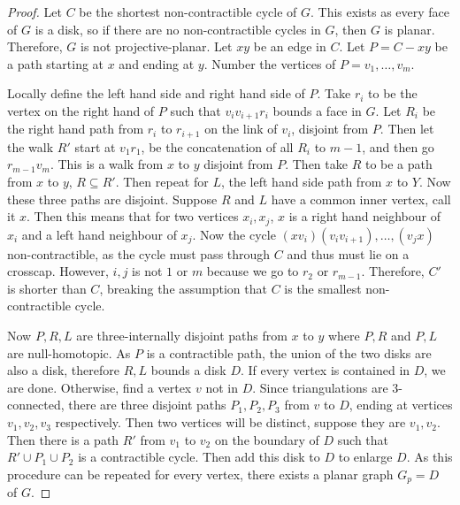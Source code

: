 \begin{proof}
    Let $C$ be the shortest non-contractible cycle of $G$. This exists as every face of $G$ is a disk, so if there are no non-contractible cycles in $G$, then $G$ is planar. Therefore, $G$ is not projective-planar. Let $xy$ be an edge in $C$. Let $P = C - xy$ be a path starting at $x$ and ending at $y$. 
    Number the vertices of $P = v_1, \ldots, v_m$. 

    Locally define the left hand side and right hand side of $P$. Take $r_i$ to be the vertex on the right hand of $P$ such that $v_i v_{i + 1} r_i$ bounds a face in $G$. Let $R_i$ be the right hand path from $r_i$ to $r_{i + 1}$ on the link of $v_i$, disjoint from $P$. Then let the walk $R'$ start at $v_1 r_1$, be the concatenation of all $R_i$ to $m-1$, and then go $r_{m-1} v_m$. This is a walk from $x$ to $y$ disjoint from $P$. Then take $R$ to be a path from $x$ to $y$, $R \subseteq R'$. Then repeat for $L$, the left hand side path from $x$ to $Y$. Now these three paths are disjoint. Suppose $R$ and $L$ have a common inner vertex, call it $x$. Then this means that for two vertices $x_i, x_j$, $x$ is a right hand neighbour of $x_i$ and a left hand neighbour of $x_j$. Now the cycle $(x v_i) (v_i v_{i + 1}), \ldots , (v_j x)$ non-contractible, as the cycle must pass through $C$ and thus must lie on a crosscap. However, $i, j$ is not $1$ or $m$ because we go to $r_2$ or $r_{m-1}$. Therefore, $C'$ is shorter than $C$, breaking the assumption that $C$ is the smallest non-contractible cycle.

    Now $P, R, L$ are three-internally disjoint paths from $x$ to $y$ where $P, R$ and $P, L$ are null-homotopic. As $P$ is a contractible path, the union of the two disks are also a disk, therefore $R, L$ bounds a disk $D$. If every vertex is contained in $D$, we are done. Otherwise, find a vertex $v$ not in $D$. Since triangulations are 3-connected, there are three disjoint paths $P_1, P_2, P_3$ from $v$ to $D$, ending at vertices $v_1, v_2, v_3$ respectively. Then two vertices will be distinct, suppose they are $v_1, v_2$. Then there is a path $R'$ from $v_1$ to $v_2$ on the boundary of $D$ such that $R' \cup P_1 \cup P_2$ is a contractible cycle. Then add this disk to $D$ to enlarge $D$. As this procedure can be repeated for every vertex, there exists a planar graph $G_p = D$ of $G$. 
\end{proof}

